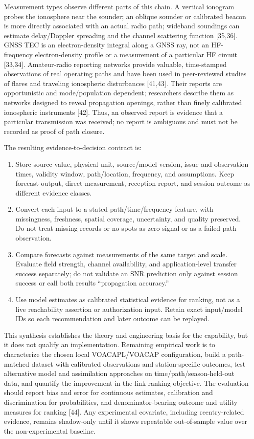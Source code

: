 \documentclass[11pt,a4paper]{article}
\begin{document}
Measurement types observe different parts of this chain. A vertical ionogram
probes the ionosphere near the sounder; an oblique sounder or calibrated
beacon is more directly associated with an actual radio path; wideband
soundings can estimate delay/Doppler spreading and the channel scattering
function [35,36]. GNSS TEC is an electron-density integral along a GNSS ray,
not an HF-frequency electron-density profile or a measurement of a particular
HF circuit [33,34]. Amateur-radio reporting networks provide valuable,
time-stamped observations of real operating paths and have been used in
peer-reviewed studies of flares and traveling ionospheric disturbances
[41,43]. Their reports are opportunistic and mode/population dependent;
researchers describe them as networks designed to reveal propagation
openings, rather than finely calibrated ionospheric instruments [42]. Thus,
an observed report is evidence that a particular transmission was received;
no report is ambiguous and must not be recorded as proof of path closure.

The resulting evidence-to-decision contract is:
\begin{enumerate}
  \item Store source value, physical unit, source/model version, issue and
        observation times, validity window, path/location, frequency, and
        assumptions. Keep forecast output, direct measurement, reception
        report, and session outcome as different evidence classes.
  \item Convert each input to a stated path/time/frequency feature, with
        missingness, freshness, spatial coverage, uncertainty, and quality
        preserved. Do not treat missing records or no spots as zero signal or
        as a failed path observation.
  \item Compare forecasts against measurements of the same target and scale.
        Evaluate field strength, channel availability, and application-level
        transfer success separately; do not validate an SNR prediction only
        against session success or call both results “propagation accuracy.”
  \item Use model estimates as calibrated statistical evidence for ranking,
        not as a live reachability assertion or authorization input. Retain
        exact input/model IDs so each recommendation and later outcome can be
        replayed.
\end{enumerate}

This synthesis establishes the theory and engineering basis for the
capability, but it does not qualify an implementation. Remaining empirical
work is to characterize the chosen local VOACAPL/VOACAP configuration, build
a path-matched dataset with calibrated observations and station-specific
outcomes, test alternative model and assimilation approaches on
time/path/season-held-out data, and quantify the improvement in the link
ranking objective. The evaluation should report bias and error for continuous
estimates, calibration and discrimination for probabilities, and
denominator-bearing outcome and utility measures for ranking [44]. Any experimental
covariate, including reentry-related evidence, remains shadow-only until it
shows repeatable out-of-sample value over the non-experimental baseline.
\end{document}
